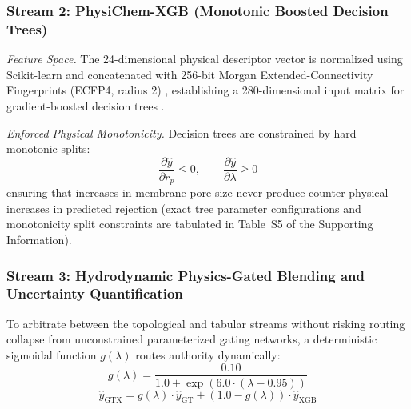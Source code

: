 \documentclass[11pt]{article}
\begin{document}
\subsubsection{Stream 2: PhysiChem-XGB (Monotonic Boosted Decision Trees)}

\textit{Feature Space.} The 24-dimensional physical descriptor vector is normalized using Scikit-learn \cite{pedregosa2011} and concatenated with 256-bit Morgan Extended-Connectivity Fingerprints (ECFP4, radius 2) \cite{rogers2010}, establishing a 280-dimensional input matrix for gradient-boosted decision trees \cite{chen2016,ke2017}.

\textit{Enforced Physical Monotonicity.} Decision trees are constrained by hard monotonic splits:
\begin{equation}
\frac{\partial \hat{y}}{\partial r_p} \leq 0, \qquad \frac{\partial \hat{y}}{\partial \lambda} \geq 0
\label{eq:monotonic}
\end{equation}
ensuring that increases in membrane pore size never produce counter-physical increases in predicted rejection (exact tree parameter configurations and monotonicity split constraints are tabulated in Table~S5 of the Supporting Information).

\subsubsection{Stream 3: Hydrodynamic Physics-Gated Blending and Uncertainty Quantification}

To arbitrate between the topological and tabular streams without risking routing collapse from unconstrained parameterized gating networks, a deterministic sigmoidal function $g(\lambda)$ routes authority dynamically:
\begin{equation}
g(\lambda) = \frac{0.10}{1.0 + \exp\left(6.0 \cdot (\lambda - 0.95)\right)}
\label{eq:gate}
\end{equation}
\begin{equation}
\hat{y}_{\mathrm{GTX}} = g(\lambda) \cdot \hat{y}_{\mathrm{GT}} + \left(1.0 - g(\lambda)\right) \cdot \hat{y}_{\mathrm{XGB}}
\label{eq:mixture}
\end{equation}
\end{document}
